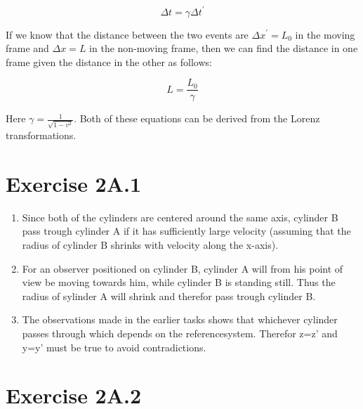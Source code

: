 \documentclass[a4paper,10pt,english]{article}
\begin{document}
\begin{equation}\label{eq:time_dila}
\Delta t=\gamma\Delta t^{\prime}
\end{equation}

If we know that the distance between the two events are $\Delta x^{\prime}=L_{0}$ in the moving frame and $\Delta x=L$ in the non-moving frame, then we can find the distance in one frame given the distance in the other as follows:

\begin{equation}\label{eq:len_con}
L=\frac{L_{0}}{\gamma}
\end{equation}

Here $\gamma=\frac{1}{\sqrt{1-v^{2}}}$. Both of these equations can be derived from the Lorenz transformations.

\newpage








\section*{Exercise 2A.1}

\begin{enumerate}

\item Since both of the cylinders are centered around the same axis, cylinder B pass trough cylinder A if it has sufficiently large velocity (assuming that the radius of cylinder B shrinks with velocity along the x-axis).

\item For an observer positioned on cylinder B, cylinder A will from his point of view be moving towards him, while  cylinder B is standing still. Thus the radius of sylinder A will shrink and therefor pass trough cylinder B.

\item The observations made in the earlier tasks shows that whichever cylinder passes through which depends on the referencesystem. Therefor z=z' and y=y' must be true to avoid contradictions.\\

\end{enumerate}








\section*{Exercise 2A.2}
\end{document}
